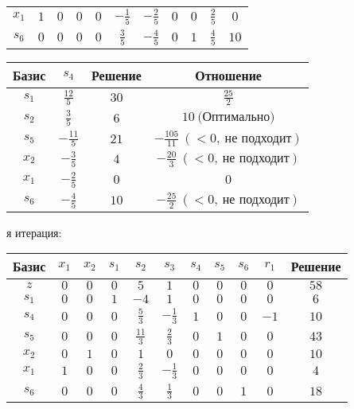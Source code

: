 \documentclass{article}%
\begin{document}
\begin{flushleft}
\begin{tabular}{|c|ccccccccc|c|}
$x_{1}$&$1$&$0$&$0$&$0$&$-\frac{1}{5}$&$-\frac{2}{5}$&$0$&$0$&$\frac{2}{5}$&$0$\\%
$s_{6}$&$0$&$0$&$0$&$0$&$\frac{3}{5}$&$-\frac{4}{5}$&$0$&$1$&$\frac{4}{5}$&$10$\\%
\hline%
\end{tabular}%
\newline%
\newline%
\newline%
\begin{tabular}{|cccc|}%
\hline%
Базис&$s_{4}$&Решение&Отношение\\%
\hline%
$s_{1}$&$\frac{12}{5}$&$30$&$\frac{25}{2}$\\%
$s_{2}$&$\frac{3}{5}$&$6$&$10\: \text{(Оптимально)}$\\%
$s_{5}$&$-\frac{11}{5}$&$21$&$-\frac{105}{11}\: (< 0, \: \text{не подходит})$\\%
$x_{2}$&$-\frac{3}{5}$&$4$&$-\frac{20}{3}\: (< 0, \: \text{не подходит})$\\%
$x_{1}$&$-\frac{2}{5}$&$0$&$0$\\%
$s_{6}$&$-\frac{4}{5}$&$10$&$-\frac{25}{2}\: (< 0, \: \text{не подходит})$\\%
\hline%
\end{tabular}%
\newline%
\newline%
я итерация: %
\newline%
\newline%
\renewcommand{\arraystretch}{1.3}%
\begin{tabular}{|c|ccccccccc|c|}%
\hline%
Базис&$x_{1}$&$x_{2}$&$s_{1}$&$s_{2}$&$s_{3}$&$s_{4}$&$s_{5}$&$s_{6}$&$r_{1}$&Решение\\%
\hline%
$z$&$0$&$0$&$0$&$5$&$1$&$0$&$0$&$0$&$0$&$58$\\%
\hline%
$s_{1}$&$0$&$0$&$1$&$-4$&$1$&$0$&$0$&$0$&$0$&$6$\\%
$s_{4}$&$0$&$0$&$0$&$\frac{5}{3}$&$-\frac{1}{3}$&$1$&$0$&$0$&$-1$&$10$\\%
$s_{5}$&$0$&$0$&$0$&$\frac{11}{3}$&$\frac{2}{3}$&$0$&$1$&$0$&$0$&$43$\\%
$x_{2}$&$0$&$1$&$0$&$1$&$0$&$0$&$0$&$0$&$0$&$10$\\%
$x_{1}$&$1$&$0$&$0$&$\frac{2}{3}$&$-\frac{1}{3}$&$0$&$0$&$0$&$0$&$4$\\%
$s_{6}$&$0$&$0$&$0$&$\frac{4}{3}$&$\frac{1}{3}$&$0$&$0$&$1$&$0$&$18$\\%
\hline%
\end{tabular}%
\newline%
\end{flushleft}%
\end{document}
